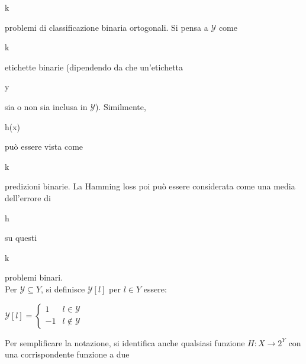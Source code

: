 \begin{it}k\end{it} problemi di classificazione binaria ortogonali. Si pensa a 
\begin{math}\mathcal{Y}\end{math} come \begin{it}k\end{it} 
etichette binarie (dipendendo da che un'etichetta \begin{it}y\end{it} sia o 
non sia inclusa in \begin{math}\mathcal{Y}\end{math}). 
Similmente, \begin{it}h(x)\end{it} pu\`o essere vista come \begin{it}k\end{it} predizioni binarie. 
La Hamming loss poi pu\`o essere considerata come una media dell'errore di \begin{it}h\end{it} su questi 
\begin{it}k\end{it} problemi binari. \\
Per  \begin{math} \mathcal{Y} \subseteq Y \end{math}, si definisce \begin{math}
                                                                    \mathcal{Y}\left[l\right]
                                                                   \end{math} per \begin{math}
                                                                                   l \in Y
                                                                                  \end{math} essere:
\begin{center}
 \begin{math}
   \mathcal{Y}\left[l\right] = \begin{cases}1 & l \in \mathcal{Y}\\
-1 & l\notin \mathcal{Y}\end{cases}
 \end{math}

\end{center}
Per semplificare la notazione, si identifica anche qualsiasi funzione 
\begin{math} H : X \rightarrow 2^Y\end{math} con una corrispondente funzione a due 
